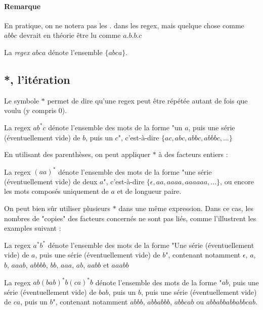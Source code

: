 \paragraph{Remarque} En pratique, on ne notera pas les $.$ dans les regex, mais quelque chose comme $abbc$ devrait en théorie être lu comme $a.b.b.c$


\begin{example}
La \textit{regex} $abca$ dénote l'ensemble $\{abca\}$.
\end{example}


\subsection{*, l'itération}

Le symbole $*$ permet de dire qu'une regex peut être répétée autant de fois que voulu (y compris 0). 

\begin{example}
La regex $ab^*c$ dénote l'ensemble des mots de la forme "un $a$, puis une série (éventuellement vide) de $b$, puis un $c$", c'est-à-dire $\{ac, abc, abbc, abbbc, ...\}$
\end{example}

En utilisant des parenthèses, on peut appliquer $*$ à des facteurs entiers :

\begin{example}
La regex $(aa)^*$ dénote l'ensemble des mots de la forme "une série (éventuellement vide) de deux $a$", c'est-à-dire $\{\epsilon, aa, aaaa, aaaaaa, ...\}$, ou encore les mots composés uniquement de $a$ et de longueur paire.
\end{example}

On peut bien sûr utiliser plusieurs $*$ dans une même expression. Dans ce cas, les nombres de "copies" des facteurs concernés ne sont pas liés, comme l'illustrent les examples suivant :


\begin{example}
\label{ex0}
La regex $a^*b^*$ dénote l'ensemble des mots de la forme "Une série (éventuellement vide) de $a$, puis une série (éventuellement vide) de $b$", contenant notamment $\epsilon$, $a$, $b$, $aaab$, $abbbb$, $bb$, $aaa$, $ab$, $aabb$ et $aaabb$
\end{example}

\begin{example}
\label{ex1}
La regex $ab(bab)^*b(ca)^*b$ dénote l'ensemble des mots de la forme "$ab$, puis une série (éventuellement vide) de $bab$, puis un $b$, puis une série (éventuellement vide) de $ca$, puis un $b$", contenant notamment $abbb$, $abbabbb$, $abbcab$ ou $abbabbabbabbcab$.
\end{example}

